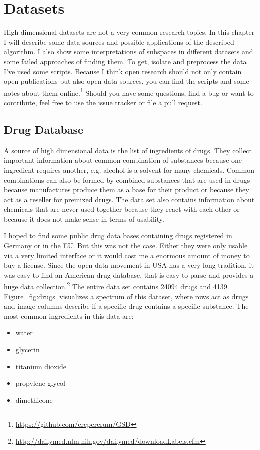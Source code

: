 \chapter{Datasets}
High dimensional datasets are not a very common research topics. In this chapter I will describe some data sources and possible applications of the described algorithm. I also show some interpretations of subspaces in different datasets and some failed approaches of finding them. To get, isolate and preprocess the data I've used some scripts. Because I think open research should not only contain open publications but also open data sources, you can find the scripts and some notes about them online.\footnote{\url{https://github.com/crepererum/GSD}} Should you have some questions, find a bug or want to contribute, feel free to use the issue tracker or file a pull request.

\section{Drug Database}
A source of high dimensional data is the list of ingredients of drugs. They collect important information about common combination of substances because one ingredient requires another, e.g. alcohol is a solvent for many chemicals. Common combinations can also be formed by combined substances that are used in drugs because manufactures produce them as a base for their product or because they act as a reseller for premixed drugs. The data set also contains information about chemicals that are never used together because they react with each other or because it does not make sense in terms of usability.

I hoped to find some public drug data bases containing drugs registered in Germany or in the EU. But this was not the case. Either they were only usable via a very limited interface or it would cost me a enormous amount of money to buy a license. Since the open data movement in USA has a very long tradition, it was easy to find an American drug database, that is easy to parse and provides a huge data collection.\footnote{\url{http://dailymed.nlm.nih.gov/dailymed/downloadLabels.cfm}} The entire data set contains \num{24094} drugs and \num{4139}. Figure~\ref{fig:drugs} visualizes a spectrum of this dataset, where rows act as drugs and image columns describe if a specific drug contains a specific substance. The most common ingredients in this data are:
\begin{itemize}
	\item water
	\item glycerin
	\item titanium dioxide
	\item propylene glycol
	\item dimethicone
\end{itemize}

